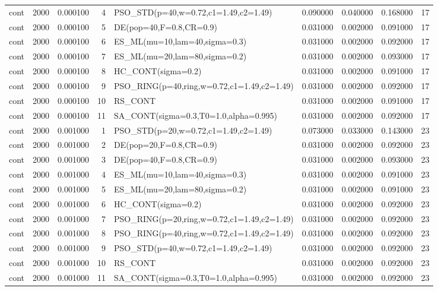 \begin{longtable}{lrrrlrrrr}
cont & 2000 & 0.000100 & 4 & PSO\_STD(p=40,w=0.72,c1=1.49,c2=1.49) & 0.090000 & 0.040000 & 0.168000 & 17 \\
cont & 2000 & 0.000100 & 5 & DE(pop=40,F=0.8,CR=0.9) & 0.031000 & 0.002000 & 0.091000 & 17 \\
cont & 2000 & 0.000100 & 6 & ES\_ML(mu=10,lam=40,sigma=0.3) & 0.031000 & 0.002000 & 0.092000 & 17 \\
cont & 2000 & 0.000100 & 7 & ES\_ML(mu=20,lam=80,sigma=0.2) & 0.031000 & 0.002000 & 0.093000 & 17 \\
cont & 2000 & 0.000100 & 8 & HC\_CONT(sigma=0.2) & 0.031000 & 0.002000 & 0.091000 & 17 \\
cont & 2000 & 0.000100 & 9 & PSO\_RING(p=40,ring,w=0.72,c1=1.49,c2=1.49) & 0.031000 & 0.002000 & 0.092000 & 17 \\
cont & 2000 & 0.000100 & 10 & RS\_CONT & 0.031000 & 0.002000 & 0.091000 & 17 \\
cont & 2000 & 0.000100 & 11 & SA\_CONT(sigma=0.3,T0=1.0,alpha=0.995) & 0.031000 & 0.002000 & 0.092000 & 17 \\
cont & 2000 & 0.001000 & 1 & PSO\_STD(p=20,w=0.72,c1=1.49,c2=1.49) & 0.073000 & 0.033000 & 0.143000 & 23 \\
cont & 2000 & 0.001000 & 2 & DE(pop=20,F=0.8,CR=0.9) & 0.031000 & 0.002000 & 0.092000 & 23 \\
cont & 2000 & 0.001000 & 3 & DE(pop=40,F=0.8,CR=0.9) & 0.031000 & 0.002000 & 0.093000 & 23 \\
cont & 2000 & 0.001000 & 4 & ES\_ML(mu=10,lam=40,sigma=0.3) & 0.031000 & 0.002000 & 0.091000 & 23 \\
cont & 2000 & 0.001000 & 5 & ES\_ML(mu=20,lam=80,sigma=0.2) & 0.031000 & 0.002000 & 0.091000 & 23 \\
cont & 2000 & 0.001000 & 6 & HC\_CONT(sigma=0.2) & 0.031000 & 0.002000 & 0.092000 & 23 \\
cont & 2000 & 0.001000 & 7 & PSO\_RING(p=20,ring,w=0.72,c1=1.49,c2=1.49) & 0.031000 & 0.002000 & 0.092000 & 23 \\
cont & 2000 & 0.001000 & 8 & PSO\_RING(p=40,ring,w=0.72,c1=1.49,c2=1.49) & 0.031000 & 0.002000 & 0.092000 & 23 \\
cont & 2000 & 0.001000 & 9 & PSO\_STD(p=40,w=0.72,c1=1.49,c2=1.49) & 0.031000 & 0.002000 & 0.092000 & 23 \\
cont & 2000 & 0.001000 & 10 & RS\_CONT & 0.031000 & 0.002000 & 0.092000 & 23 \\
cont & 2000 & 0.001000 & 11 & SA\_CONT(sigma=0.3,T0=1.0,alpha=0.995) & 0.031000 & 0.002000 & 0.092000 & 23 \\

\end{longtable}
